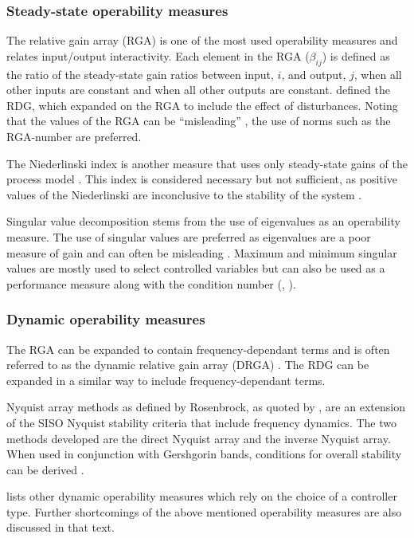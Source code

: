 \subsubsection{Steady-state operability measures}
The relative gain array (RGA) is one of the most used operability measures \citep[576]{luyben} and relates input/output interactivity.
Each element in the RGA ($\beta_{ij}$) is defined as the ratio of the steady-state gain ratios between input, $i$, and output, $j$, when all other inputs are constant and when all other outputs are constant.
\citet{artrdg} defined the RDG, which expanded on the RGA to include the effect of disturbances. 
Noting that the values of the RGA can be ``misleading'' \citep[87]{skogestad}, the use of norms such as the RGA-number are preferred.

The Niederlinski index is another measure that uses only steady-state gains of the process model \citep[572-573]{luyben}. 
This index is considered necessary but not sufficient, as positive values of the Niederlinski are inconclusive to the stability of the system \citep[445]{skogestad}.

Singular value decomposition stems from the use of eigenvalues as an operability measure. 
The use of singular values are preferred as eigenvalues are a poor
measure of gain and can often be misleading \citep[75]{skogestad}.
Maximum and minimum singular values are mostly used to select controlled variables but can also be used as a performance measure along with the condition number (\citet[596]{luyben}, \citet[80-82]{skogestad}).

\subsubsection{Dynamic operability measures}
The RGA can be expanded to contain frequency-dependant terms and is often referred to as the dynamic relative gain array (DRGA) \citep[637]{marlin}. 
The RDG \citep{artrdg} can be expanded in a similar way to include frequency-dependant terms.

Nyquist array methods as defined by Rosenbrock, as quoted by \citet[92]{skogestad}, are an extension of the SISO Nyquist stability criteria that include frequency dynamics. 
The two methods developed are the direct Nyquist array and the inverse Nyquist array. 
When used in conjunction with Gershgorin bands, conditions for overall stability can be derived \citep[440]{skogestad}.

\citet{vinsonphd} lists other dynamic operability measures which rely on the choice of a controller type. Further shortcomings of the above mentioned operability measures are also discussed in that text. 

